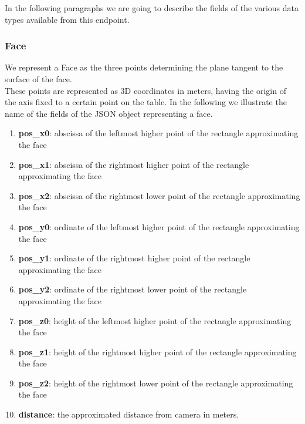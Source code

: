 \documentclass[a4paper,notitlepage,onecolumn]{hitec}  %
\begin{document}
In the following paragraphs we are going to describe the fields of the various data types available from this endpoint.

\subsubsection{Face}
We represent a Face as the three points determining the plane tangent to the surface of the face.\\These points are represented as 3D coordinates in meters, having the origin of the axis fixed to a certain point on the table. In the following we illustrate the name of the fields of the JSON object representing a face.

\begin{enumerate}
\item\textbf{pos\_x0}: abscissa of the leftmost higher point of the rectangle approximating the face
\item\textbf{pos\_x1}: abscissa of the rightmost higher point of the rectangle approximating the face
\item\textbf{pos\_x2}: abscissa of the rightmost lower point of the rectangle approximating the face
\item\textbf{pos\_y0}: ordinate of the leftmost higher point of the rectangle approximating the face
\item\textbf{pos\_y1}: ordinate of the rightmost higher point of the rectangle approximating the face
\item\textbf{pos\_y2}: ordinate of the rightmost lower point of the rectangle approximating the face
\item\textbf{pos\_z0}: height of the leftmost higher point of the rectangle approximating the face
\item\textbf{pos\_z1}: height of the rightmost higher point of the rectangle approximating the face
\item\textbf{pos\_z2}: height of the rightmost lower point of the rectangle approximating the face
\item\textbf{distance}: the approximated distance from camera in meters. 
\end{enumerate}
\end{document}
